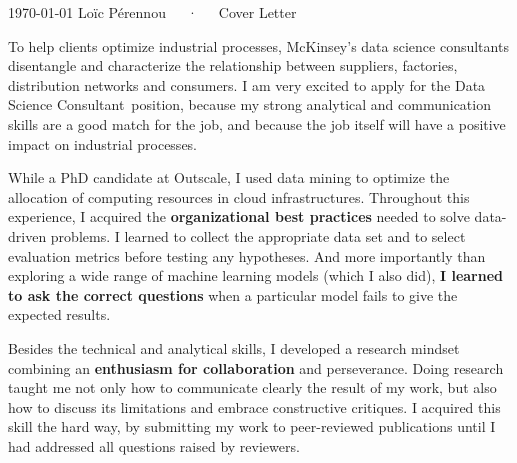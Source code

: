 \documentclass[11pt, a4paper]{awesome-cv}
\newcommand{\company}{McKinsey}
\newcommand{\job}{Data Science Consultant}
\begin{document}
\makecvheader[R]

\makecvfooter
  {\today}
  {Loïc Pérennou~~~·~~~Cover Letter}
  {}

\makelettertitle

\begin{cvletter}
  To help clients optimize industrial processes, \company's data science consultants disentangle and characterize the relationship between suppliers, factories, distribution networks and consumers.  
  I am very excited to apply for the \job~position, because my strong analytical and communication skills are a good match for the job, and because the job itself will have a positive impact on industrial processes. 

While a PhD candidate at Outscale, I used data mining to optimize the allocation of computing resources in cloud infrastructures. 
Throughout this experience, I acquired the \textbf{organizational best practices} needed to solve data-driven problems.  
I learned to collect the appropriate data set and to select evaluation metrics before testing any hypotheses. 
And more importantly than exploring a wide range of machine learning models (which I also did), \textbf{I learned to ask the correct questions} when a particular model fails to give the expected results.  

Besides the technical and analytical skills, I developed a research mindset combining an \textbf{enthusiasm for collaboration} and perseverance.  
Doing research taught me not only how to communicate clearly the result of my work, but also how to discuss its limitations and embrace constructive critiques.  
I acquired this skill the hard way, by submitting my work to peer-reviewed publications until I had addressed all questions raised by reviewers. 


\end{cvletter}
\end{document}
